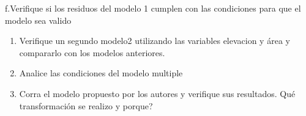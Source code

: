 \documentclass[
]{book}
\begin{document}
f.Verifique si los residuos del modelo 1 cumplen con las condiciones para que el modelo sea valido

\begin{enumerate}
\def\labelenumi{\alph{enumi}.}
\setcounter{enumi}{6}
\item
  Verifique un segundo modelo2 utilizando las variables elevacion y área y compararlo con los modelos anteriores.\\
\item
  Analice las condiciones del modelo multiple
\item
  Corra el modelo propuesto por los autores y verifique sus resultados. Qué transformación se realizo y porque?
\end{enumerate}

  
\end{document}
